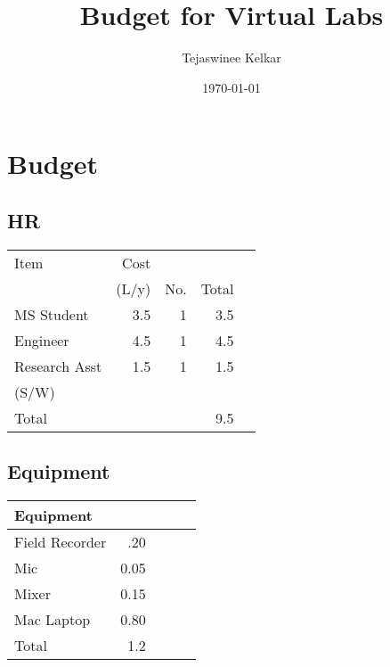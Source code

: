 \documentclass[11pt]{article}
\title{Budget for Virtual Labs}
\author{Tejaswinee Kelkar}
\date{\today}
\begin{document}
\maketitle

\setcounter{tocdepth}{3}
\tableofcontents
\vspace*{1cm}


\section{Budget}
\label{sec-1}
\subsection{HR}
\label{sec-1-1}


\begin{center}
\begin{tabular}{lrrrl}
\hline
 Item           &   Cost  &       &         &     \\
                &  (L/y)  &  No.  &  Total  &     \\
\hline
 MS Student     &    3.5  &    1  &    3.5  &     \\
\hline
 Engineer       &    4.5  &    1  &    4.5  &     \\
\hline
 Research Asst  &    1.5  &    1  &    1.5  &     \\
 (S/W)          &         &       &         &     \\
\hline
 Total          &         &       &    9.5  &     \\
\hline
\end{tabular}
\end{center}
\subsection{Equipment}
\label{sec-1-2}



\begin{center}
\begin{tabular}{lrlll}
\hline
 Equipment       &        &     &     &     \\
\hline
 Field Recorder  &   .20  &     &     &     \\
\hline
 Mic             &  0.05  &     &     &     \\
\hline
 Mixer           &  0.15  &     &     &     \\
\hline
 Mac Laptop      &  0.80  &     &     &     \\
\hline
 Total           &   1.2  &     &     &     \\
\hline
\end{tabular}
\end{center}
\end{document}
